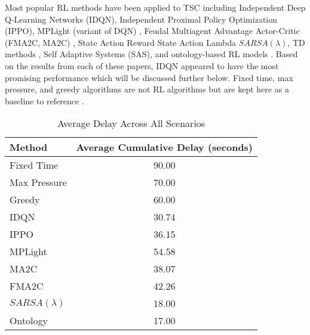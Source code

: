 \documentclass[letterpaper]{article} %
\begin{document}
Most popular RL methods have been applied to TSC including Independent Deep Q-Learning Networks (IDQN), Independent Proximal Policy Optimization (IPPO), MPLight (variant of DQN) \cite{Chen_Wei_Xu_Zheng_Yang_Xiong_Xu_Li_2020}, Feudal Multiagent Advantage Actor-Critic (FMA2C, MA2C) \cite{DBLP:journals/corr/abs-1903-04527}, State Action Reward State Action Lambda \(SARSA(\lambda)\), TD methods \cite{Reza2023}, Self Adaptive Systems (SAS), and ontology-based RL models \cite{Ghanadbashi2023}.
Based on the results from each of these papers, IDQN appeared to have the most promising performance which will be discussed further below.
Fixed time, max pressure, and greedy algorithms are not RL algorithms but are kept here as a baseline to reference \cite{ault2021reinforcement} \cite{Chen_Wei_Xu_Zheng_Yang_Xiong_Xu_Li_2020}.


\begin{table}[H]
\centering
\begin{tabular}{lc}
\hline
\textbf{Method} & \textbf{Average Cumulative Delay (seconds)} \\ \hline
Fixed Time      & 90.00\footnotemark[2] \\
Max Pressure    & 70.00\footnotemark[2] \\
Greedy          & 60.00\footnotemark[2] \\
IDQN            & 30.74                  \\
IPPO            & 36.15                  \\
MPLight         & 54.58                  \\
MA2C            & 38.07\footnotemark[1]                  \\
FMA2C           & 42.26                  \\
\(SARSA(\lambda)\)           & 18.00\footnotemark[2]                  \\
Ontology        & 17.00\footnotemark[2]                  \\ \hline
\end{tabular}
\caption{Average Delay Across All Scenarios}
\label{tab:avg_delay}
\end{table}
\end{document}
